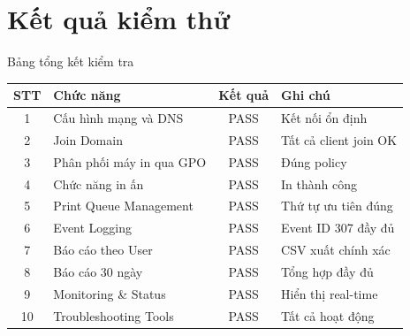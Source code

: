 \documentclass{beamer}
\begin{document}
    \section{Kết quả kiểm thử}
    \begin{frame}{Bảng tổng kết kiểm tra}
        \begin{table}[ht]
            \centering
            \tiny
            \begin{tabular}{|c|l|c|l|}
            \hline
            \textbf{STT} & \textbf{Chức năng} & \textbf{Kết quả} & \textbf{Ghi chú} \\
            \hline
            1 & Cấu hình mạng và DNS & PASS & Kết nối ổn định \\
            \hline
            2 & Join Domain & PASS & Tất cả client join OK \\
            \hline
            3 & Phân phối máy in qua GPO & PASS & Đúng policy \\
            \hline
            4 & Chức năng in ấn & PASS & In thành công \\
            \hline
            5 & Print Queue Management & PASS & Thứ tự ưu tiên đúng \\
            \hline
            6 & Event Logging & PASS & Event ID 307 đầy đủ \\
            \hline
            7 & Báo cáo theo User & PASS & CSV xuất chính xác \\
            \hline
            8 & Báo cáo 30 ngày & PASS & Tổng hợp đầy đủ \\
            \hline
            9 & Monitoring \& Status & PASS & Hiển thị real-time \\
            \hline
            10 & Troubleshooting Tools & PASS & Tất cả hoạt động \\
            \hline
            \end{tabular}
        \end{table}
    \end{frame}
\end{document}
